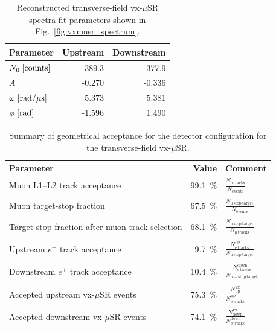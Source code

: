 \documentclass[11pt,a4paper]{article}
\begin{document}
\begin{table}[hbt]
\centering
\caption{Reconstructed transverse-field vx-$\mu$SR spectra fit-parameters shown in Fig.~\ref{fig:vxmusr_spectrum}.}
\label{tab:sim2_param}
\begin{tabular}{lrr}
\toprule
Parameter & Upstream & Downstream \\
\midrule
$N_0\;{\rm [counts]}$    & 389.3  & 377.9  \\
$A$      & -0.270 & -0.336 \\
$\omega\;{\rm [rad/\mu s]}$ & 5.373  & 5.381 \\
$\phi\;{\rm [rad]}$   & -1.596 & 1.490 \\
\bottomrule
\end{tabular}
\end{table}

\begin{table}[hbt]
\centering
\caption{Summary of geometrical acceptance for the detector configuration for the transverse-field vx-$\mu$SR.}
\label{tab:sim2_accept}
\begin{tabular}{lrl}
\toprule
Parameter & Value & Comment\\
\midrule
Muon L1--L2 track acceptance &  99.1~\% &  $\frac{N_\mathrm{\mu\,tracks}}{N_\mathrm{events}}$\\
 & & \\
Muon target-stop fraction & 67.5~\% & $\frac{N_\mathrm{\mu\,stop\,target}}{N_\mathrm{events}}$\\
 & & \\
Target-stop fraction after muon-track selection & 68.1~\% & $\frac{N_\mathrm{\mu\,stop\,target}}{N_\mathrm{\mu\,tracks}}$ \\
 & & \\
Upstream $e^+$ track acceptance & 9.7~\% & $\frac{N_\mathrm{e\,tracks}^\mathrm{up}}{N_\mathrm{\mu\,stop\,target}}$ \\
 & & \\
Downstream $e^+$ track acceptance & 10.4~\% & $\frac{N_\mathrm{e\,tracks}^\mathrm{down}}{N_\mathrm{\mu-stop\,target}}$ \\
 & & \\
Accepted upstream vx-$\mu$SR events & 75.3~\% &  $\frac{N^\mathrm{vx}_\mathrm{up}}{N_\mathrm{e\,tracks}^\mathrm{up}}$ \\
 & & \\ 
Accepted downstream vx-$\mu$SR events & 74.1~\% & $\frac{N^\mathrm{vx}_\mathrm{down}}{N_\mathrm{e\,tracks}^\mathrm{down}}$ \\
\bottomrule
\end{tabular}
\end{table}
\end{document}
